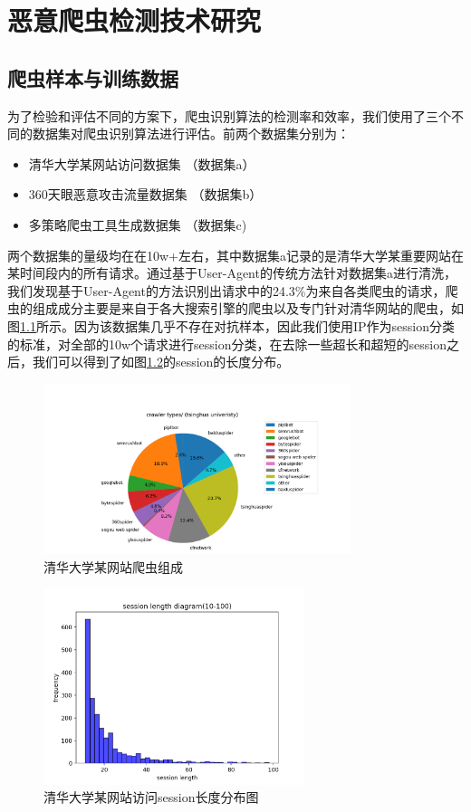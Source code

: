 \documentclass[doctor,privacy,twoside]{buaa_mac}
\begin{document}
\chapter{恶意爬虫检测技术研究}

\section{爬虫样本与训练数据}
为了检验和评估不同的方案下，爬虫识别算法的检测率和效率，我们使用了三个不同的数据集对爬虫识别算法进行评估。前两个数据集分别为：
\begin{itemize}
\item 清华大学某网站访问数据集 （数据集a）
\item 360天眼恶意攻击流量数据集 （数据集b）
\item 多策略爬虫工具生成数据集 （数据集c)
\end{itemize}

两个数据集的量级均在在10w+左右，其中数据集a记录的是清华大学某重要网站在某时间段内的所有请求。通过基于User-Agent的传统方法针对数据集a进行清洗，我们发现基于User-Agent的方法识别出请求中的24.3\%为来自各类爬虫的请求，爬虫的组成成分主要是来自于各大搜索引擎的爬虫以及专门针对清华网站的爬虫，如图\ref{fig:crawlers}所示。因为该数据集几乎不存在对抗样本，因此我们使用IP作为session分类的标准，对全部的10w个请求进行session分类，在去除一些超长和超短的session之后，我们可以得到了如图\ref{fig:session_len}的session的长度分布。

\begin{figure}[!h]
  \centering
  \includegraphics[width=0.8\textwidth]{images/THU_crawler_types.png}
  \caption{清华大学某网站爬虫组成}
  \label{fig:crawlers}
\end{figure}

\begin{figure}[!h]
  \centering
  \includegraphics[width=0.68\textwidth]{images/session_len_10_100.png}
  \caption{清华大学某网站访问session长度分布图}
  \label{fig:session_len}
\end{figure}
\end{document}
